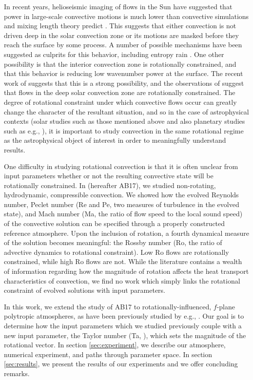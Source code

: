 \documentclass[twocolumn, amsmath, amsfonts, amssymb]{aastex62}
\begin{document}
In recent years, helioseismic imaging of flows in the Sun have suggested that
power in large-scale convective motions is much lower than convective simulations
and mixing length theory predict \citep{hanasoge&all2012, greer&all2015L}.
This suggests that either convection is not driven deep in the solar convection
zone or its motions are masked before they reach the surface by some process.
A number of possible mechanisms have been suggested as culprits for this behavior,
including entropy rain \citep{brandenburg2016}. One other possibility is that the
interior convection zone is rotationally constrained, and that this behavior is
reducing low wavenumber power at the surface. The recent work of
\cite{featherstone&hindman2016} suggests that this is a strong possibility,
and the observations of \cite{greer&all2016} suggest that flows in the deep solar
convection zone are rotationally constrained. The degree of rotational constraint
under which convective flows occur can greatly change the character of the
resultant situation, and so in the case of astrophysical contexts (solar studies
such as those mentioned above and also planetary studies such as e.g., 
\cite{soderlund&all2015}), it is important to study convection in the same
rotational regime as the astrophysical object of interest in order to meaningfully
understand results.

One difficulty in studying rotational convection is that it is often unclear
from input parameters whether or not the resulting convective state will be rotationally
constrained. In \cite{anders&brown2017} (hereafter AB17), we studied non-rotating, hydrodynamic, 
compressible convection. We showed how the evolved Reynolds number, Peclet number
(Re and Pe, two measures of turbulence in the evolved state), and Mach number
(Ma, the ratio of flow speed to the local sound speed) of the convective solution
can be specified through a properly constructed reference atmosphere. Upon the inclusion
of rotation, a fourth dynamical measure of the solution becomes meaningful: the
Rossby number (Ro, the ratio of advective dynamics to rotational constraint). Low
Ro flows are rotationally constrained, while high Ro flows are not. While the literature
contains a wealth of information regarding how the magnitude of rotation affects the
heat transport characteristics of convection, we find no work which simply links
the rotational constraint of evolved solutions with input parameters.

In this work, we extend the study of AB17 to rotationally-influenced, $f$-plane
polytropic atmospheres, as have been previously studied by e.g.,
\cite{brummell&all1996, brummell&all1998, calkins&all2015a}. Our goal is to determine
how the input parameters which we studied previously couple with a new input
parameter, the Taylor number (Ta, \cite{julien&all1996}), which sets the magnitude of the
rotational vector. In section  \ref{sec:experiment}, we describe our atmosphere, numerical
experiment, and paths through parameter space. In section \ref{sec:results}, we present
the results of our experiments and we offer concluding remarks.
\end{document}
